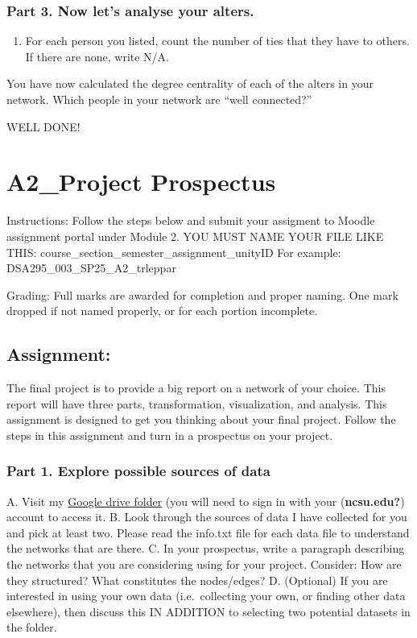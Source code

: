 \documentclass[
  letterpaper,
  DIV=11,
  numbers=noendperiod]{scrreprt}
\providecommand{\tightlist}{%
  \setlength{\itemsep}{0pt}\setlength{\parskip}{0pt}}\usepackage{longtable,booktabs,array}
\begin{document}
\subsection{Part 3. Now let's analyse your
alters.}\label{part-3.-now-lets-analyse-your-alters.}

\begin{enumerate}
\def\labelenumi{\Alph{enumi}.}
\tightlist
\item
  For each person you listed, count the number of ties that they have to
  others. If there are none, write N/A.
\end{enumerate}

You have now calculated the degree centrality of each of the alters in
your network. Which people in your network are ``well connected?''

WELL DONE!

\chapter{A2\_Project Prospectus}\label{a2_project-prospectus}

Instructions: Follow the steps below and submit your assigment to Moodle
assignment portal under Module 2. YOU MUST NAME YOUR FILE LIKE THIS:
course\_section\_semester\_assignment\_unityID For example:
DSA295\_003\_SP25\_A2\_trleppar

Grading: Full marks are awarded for completion and proper naming. One
mark dropped if not named properly, or for each portion incomplete.

\section{Assignment:}\label{assignment-1}

The final project is to provide a big report on a network of your
choice. This report will have three parts, transformation,
visualization, and analysis. This assignment is designed to get you
thinking about your final project. Follow the steps in this assignment
and turn in a prospectus on your project.

\subsection{Part 1. Explore possible sources of
data}\label{part-1.-explore-possible-sources-of-data}

A. Visit my
\href{https://drive.google.com/drive/folders/18BRSRSLjBQcbYOiu59cWZ4fzmmK3ZoWJ}{Google
drive folder} (you will need to sign in with your (\textbf{ncsu.edu?})
account to access it. B. Look through the sources of data I have
collected for you and pick at least two. Please read the info.txt file
for each data file to understand the networks that are there. C. In your
prospectus, write a paragraph describing the networks that you are
considering using for your project. Consider: How are they structured?
What constitutes the nodes/edges? D. (Optional) If you are interested in
using your own data (i.e.~collecting your own, or finding other data
elsewhere), then discuss this IN ADDITION to selecting two potential
datasets in the folder.
\end{document}

